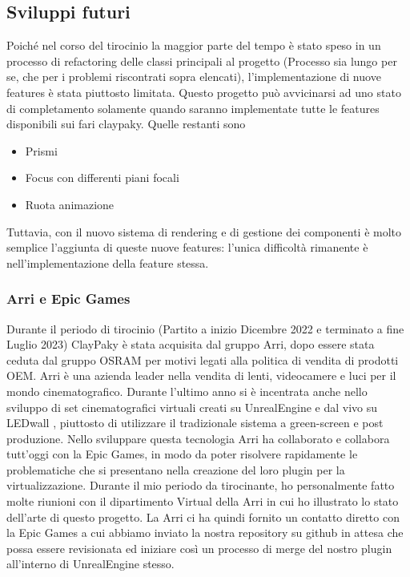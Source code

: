 \documentclass[main.tex]{subfiles}
\begin{document}

\subsection{Sviluppi futuri}\label{subsec:6_newDevelops}
Poiché nel corso del tirocinio la maggior parte del tempo è stato speso in un processo di refactoring delle classi principali al progetto (Processo sia lungo per se, che per i problemi riscontrati sopra elencati), l'implementazione di nuove features è stata piuttosto limitata. Questo progetto può avvicinarsi ad uno stato di completamento solamente quando saranno implementate tutte le features disponibili sui fari claypaky. Quelle restanti sono
\begin{itemize}
    \item Prismi
    \item Focus con differenti piani focali
    \item Ruota animazione
\end{itemize}
Tuttavia, con il nuovo sistema di rendering e di gestione dei componenti è molto semplice l'aggiunta di queste nuove features: l'unica difficoltà rimanente è nell'implementazione della feature stessa.

\subsubsection{Arri e Epic Games}\label{subsec:6_1_Arri-EG}
Durante il periodo di tirocinio (Partito a inizio Dicembre 2022 e terminato a fine Luglio 2023) ClayPaky è stata acquisita dal gruppo Arri, dopo essere stata ceduta dal gruppo OSRAM per motivi legati alla politica di vendita di prodotti OEM. Arri è una azienda leader nella vendita di lenti, videocamere e luci per il mondo cinematografico. Durante l'ultimo anno si è incentrata anche nello sviluppo di set cinematografici virtuali creati su UnrealEngine e  dal vivo su LEDwall \cite{virtualProduction}, piuttosto di utilizzare il tradizionale sistema a green-screen e post produzione. Nello sviluppare questa tecnologia Arri ha collaborato e collabora tutt'oggi con la Epic Games, in modo da poter risolvere rapidamente le problematiche che si presentano nella creazione del loro plugin per la virtualizzazione. Durante il mio periodo da tirocinante, ho personalmente fatto molte riunioni con il dipartimento Virtual della Arri in cui ho illustrato lo stato dell'arte di questo progetto. La Arri ci ha quindi fornito un contatto diretto con la Epic Games a cui abbiamo inviato la nostra repository su github in attesa che possa essere revisionata ed iniziare così un processo di merge del nostro plugin all'interno di UnrealEngine stesso.
\end{document}

